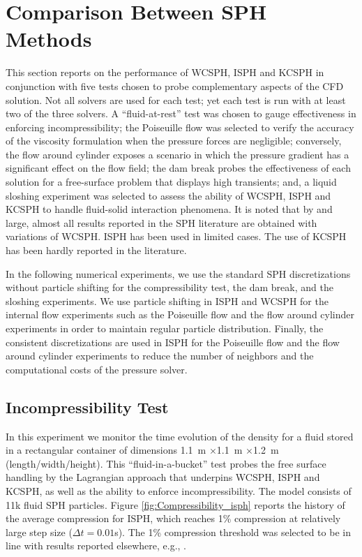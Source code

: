 \section{Comparison Between SPH Methods}\label{sec:Lag_Lag}
This section reports on the performance of WCSPH, ISPH and KCSPH in conjunction with five tests chosen to probe complementary aspects of the CFD solution. Not all solvers are used for each test; yet each test is run with at least two of the three solvers. A ``fluid-at-rest'' test was chosen to gauge effectiveness in enforcing incompressibility; the Poiseuille flow was selected to verify the accuracy of the viscosity formulation when the pressure forces are negligible; conversely, the flow around cylinder exposes a scenario in which the pressure gradient has a significant effect on the flow field; the dam break probes the effectiveness of each solution for a free-surface problem that displays high transients; and, a liquid sloshing experiment was selected to assess the ability of WCSPH, ISPH and KCSPH to handle fluid-solid interaction phenomena. It is noted that by and large, almost all results reported in the SPH literature are obtained with variations of WCSPH. ISPH has been used in limited cases. The use of KCSPH has been hardly reported in the literature.

In the following numerical experiments, we use the standard SPH discretizations without particle shifting for the compressibility test, the dam break, and the sloshing experiments. We use particle shifting in ISPH and WCSPH for the internal flow experiments such as the Poiseuille flow and the flow around cylinder experiments in order to maintain regular particle distribution. Finally, the consistent discretizations are used in ISPH for the Poiseuille flow and the flow around cylinder experiments to reduce the number of neighbors and the computational costs of the pressure solver.



\subsection{Incompressibility Test}
In this experiment we monitor the time evolution of the density for a fluid stored in a rectangular container of dimensions \SI{1.1}{m} $\times$\SI{1.1}{m} $\times$\SI{1.2}{m} (length/width/height).  This ``fluid-in-a-bucket'' test probes the free surface handling by the Lagrangian approach that underpins WCSPH, ISPH and KCSPH, as well as the ability to enforce incompressibility. The model consists of 11k fluid SPH particles. Figure \ref{fig:Compressibility_isph} reports the history of the average compression for ISPH, which reaches 1\% compression at relatively large step size ($\Delta t=0.01$\si{s}). The 1\% compression threshold was selected to be in line with results reported elsewhere, e.g., \cite{becker2007weakly}. 

